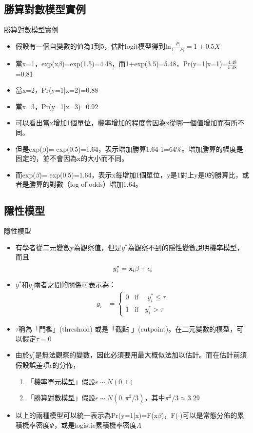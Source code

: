 \documentclass[border=10pt]{beamer}
\begin{document}
\subsection{勝算對數模型實例}
\begin{frame}{勝算對數模型實例}
\begin{itemize}
\item 假設有一個自變數的值為1到5，估計logit模型得到ln$\frac{P_{i}}{1-P_{i}}=1+0.5X$
\item 當x=1，exp(x$\beta$)=exp(1.5)=4.48，而1+exp(3.5)=5.48，Pr(y=1|x=1)=$\frac{4.48}{5.48}$=0.81
\item 當x=2，Pr(y=1|x=2)=0.88
\item 當x=3，Pr(y=1|x=3)=0.92
\item 可以看出當x增加1個單位，機率增加的程度會因為x從哪一個值增加而有所不同。
\item 但是exp($\beta$)= exp(0.5)=1.64，表示增加勝算1.64-1=64\%。增加勝算的幅度是固定的，並不會因為x的大小而不同。
\item 而exp($\beta$)= exp(0.5)=1.64，表示x每增加1個單位，y是1對上y是0的勝算比，或者是勝算的對數（log of odds）增加1.64。
\end{itemize}
\end{frame}
\subsection{隱性模型}
\begin{frame}{隱性模型}
\begin{itemize}
\item 有學者從二元變數y為觀察值，但是$y^{*}$為觀察不到的隱性變數說明機率模型，而且
\[ y_{i}^{*}=\bf{x}_{i}\beta + \epsilon_{i}\]
\item $y^{*}$和$y_{i} $兩者之間的關係可表示為：
\begin{align*}
 y_{i} &=
  \begin{cases}
   0        & \text{if }\hspace{1em}  y_{i}^{*} \leq \tau \\
   1        & \text{if}\hspace{1em} y_{i}^{*} > \tau
  \end{cases}
 \end{align*}
\item $\tau$稱為「門檻」(threshold) 或是「截點 」(cutpoint)。在二元變數的模型，可以假定$\tau=0$
\item 由於$y_{i}^{*}$是無法觀察的變數，因此必須要用最大概似法加以估計。而在估計前須假設誤差項$\epsilon$的分佈，
\begin{enumerate}
\item 「機率單元模型」假設$\epsilon\sim N(0, 1)$
\item 「勝算對數模型」假設$\epsilon\sim N(0, \pi^2/3)$，其中$\pi^2/3\approx 3.29$
\end{enumerate}
\item 以上的兩種模型可以統一表示為Pr(y=1|x)=F(x$\beta$)，F($\cdot$)可以是常態分佈的累積機率密度$\Phi$，或是logistic累積機率密度$\Lambda$
\end{itemize}
\end{frame}
\end{document}
